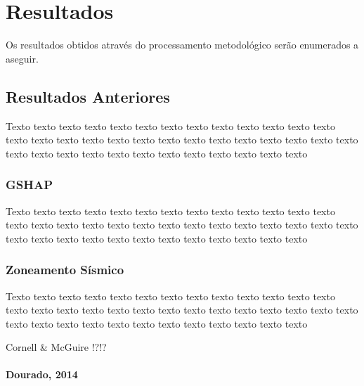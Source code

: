 \chapter{Resultados}
\label{cap:resultados}

Os resultados obtidos através do processamento metodológico serão enumerados a
aseguir.


\section{Resultados Anteriores}
\label{sec:fundamentos}

Texto texto texto texto texto texto texto texto texto texto texto texto texto
texto texto texto texto texto texto texto texto texto texto texto texto texto
texto texto texto texto texto texto texto texto texto texto texto texto texto


\subsection{GSHAP}
\label{sec:fundamentos}

Texto texto texto texto texto texto texto texto texto texto texto texto texto
texto texto texto texto texto texto texto texto texto texto texto texto texto
texto texto texto texto texto texto texto texto texto texto texto texto texto



\subsection{Zoneamento Sísmico}
\label{sec:fundamentos}

Texto texto texto texto texto texto texto texto texto texto texto texto texto
texto texto texto texto texto texto texto texto texto texto texto texto texto
texto texto texto texto texto texto texto texto texto texto texto texto texto

Cornell \& McGuire !?!?


\subsubsection{Dourado, 2014}
\label{sec:fundamentos}


